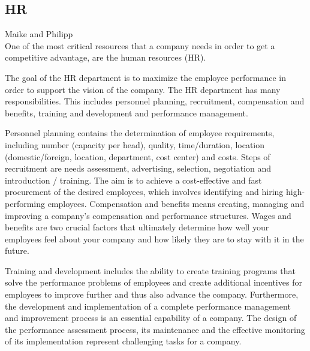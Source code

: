 \subsection{HR} \label{HR_manual}
Maike and Philipp \\

One of the most critical resources that a company needs in order to get a competitive advantage, are the human resources (HR). 

The goal of the HR department is to maximize the employee performance in order to support the vision of the company. The HR department has many responsibilities. This includes personnel planning, recruitment, compensation and benefits, training and development and performance management.

Personnel planning contains the determination of employee requirements, including number (capacity per head), quality, time/duration, location (domestic/foreign, location, department, cost center) and costs. Steps of recruitment are needs assessment, advertising, selection, negotiation and introduction / training. The aim is to achieve a cost-effective and fast procurement of the desired employees, which involves identifying and hiring high-performing employees. 
Compensation and benefits means creating, managing and improving a company's compensation and performance structures. Wages and benefits are two crucial factors that ultimately determine how well your employees feel about your company and how likely they are to stay with it in the future.

Training and development includes the ability to create training programs that solve the performance problems of employees and create additional incentives for employees to improve further and thus also advance the company. 
Furthermore, the development and implementation of a complete performance management and improvement process is an essential capability of a company. The design of the performance assessment process, its maintenance and the effective monitoring of its implementation represent challenging tasks for a company. 


